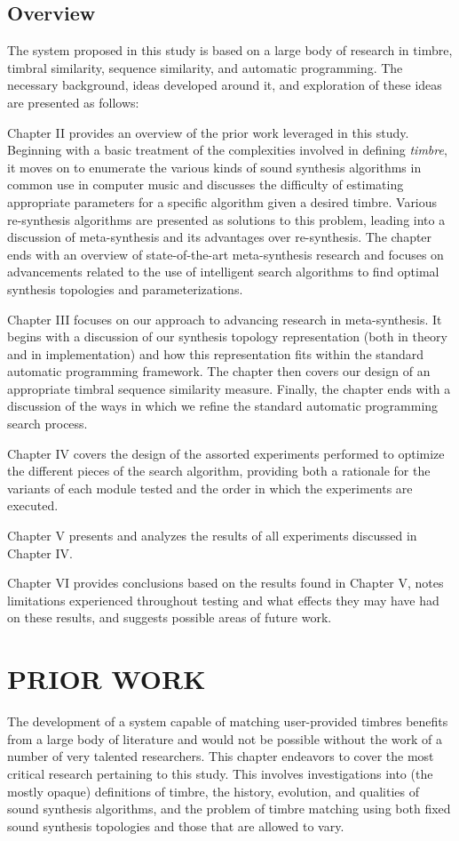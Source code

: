 \documentclass[12pt]{report} 	%
\numberwithin{figure}{chapter}
\numberwithin{table}{chapter}
\numberwithin{equation}{chapter}
\begin{document}
\begin{flushleft}
\section{Overview}
The system proposed in this study is based on a large body of research in timbre, timbral similarity, sequence similarity, and automatic programming. The necessary background, ideas developed around it, and exploration of these ideas are presented as follows:

Chapter II provides an overview of the prior work leveraged in this study. Beginning with a basic treatment of the complexities involved in defining \textit{timbre}, it moves on to enumerate the various kinds of sound synthesis algorithms in common use in computer music and discusses the difficulty of estimating appropriate parameters for a specific algorithm given a desired timbre. Various re-synthesis algorithms are presented as solutions to this problem, leading into a discussion of meta-synthesis and its advantages over re-synthesis. The chapter ends with an overview of state-of-the-art meta-synthesis research and focuses on advancements related to the use of intelligent search algorithms to find optimal synthesis topologies and parameterizations.

Chapter III focuses on our approach to advancing research in meta-synthesis. It begins with a discussion of our synthesis topology representation (both in theory and in implementation) and how this representation fits within the standard automatic programming framework. The chapter then covers our design of an appropriate timbral sequence similarity measure. Finally, the chapter ends with a discussion of the ways in which we refine the standard automatic programming search process.

Chapter IV covers the design of the assorted experiments performed to optimize the different pieces of the search algorithm, providing both a rationale for the variants of each module tested and the order in which the experiments are executed.

Chapter V presents and analyzes the results of all experiments discussed in Chapter IV.

Chapter VI provides conclusions based on the results found in Chapter V, notes limitations experienced throughout testing and what effects they may have had on these results, and suggests possible areas of future work.

\vspace*{\QuarterPage}
\chapter{PRIOR WORK} %
The development of a system capable of matching user-provided timbres benefits from a large body of literature and would not be possible without the work of a number of very talented researchers. This chapter endeavors to cover the most critical research pertaining to this study. This involves investigations into (the mostly opaque) definitions of timbre, the history, evolution, and qualities of sound synthesis algorithms, and the problem of timbre matching using both fixed sound synthesis topologies and those that are allowed to vary.


\end{flushleft}
\end{document}
